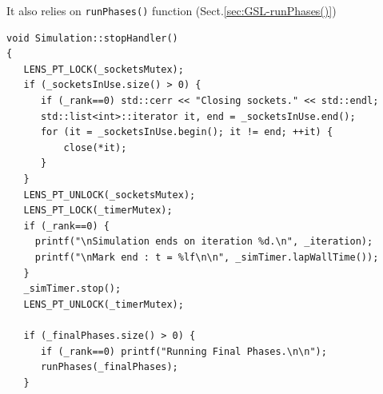 It also relies on \verb!runPhases()! function (Sect.\ref{sec:GSL-runPhases()})
\begin{lstlisting}
void Simulation::stopHandler()                                                                                
{                                                                                                             
   LENS_PT_LOCK(_socketsMutex);                                                                               
   if (_socketsInUse.size() > 0) {                                                                            
      if (_rank==0) std::cerr << "Closing sockets." << std::endl;                                             
      std::list<int>::iterator it, end = _socketsInUse.end();                                                 
      for (it = _socketsInUse.begin(); it != end; ++it) {                                                     
          close(*it);                                                                                              
      }                                                                                                       
   }                                                                                                          
   LENS_PT_UNLOCK(_socketsMutex);                                                                             
   LENS_PT_LOCK(_timerMutex);                                                                                 
   if (_rank==0) {                                                                                            
     printf("\nSimulation ends on iteration %d.\n", _iteration);                                              
     printf("\nMark end : t = %lf\n\n", _simTimer.lapWallTime());                                             
   }                                                                                                          
   _simTimer.stop();                                                                                          
   LENS_PT_UNLOCK(_timerMutex);                                                                               
                                                                                                              
   if (_finalPhases.size() > 0) {                                                                             
      if (_rank==0) printf("Running Final Phases.\n\n");                                                      
      runPhases(_finalPhases);                                                                                                                                                                         
   }                                                                                                          
                                                                                                              

\end{lstlisting}
